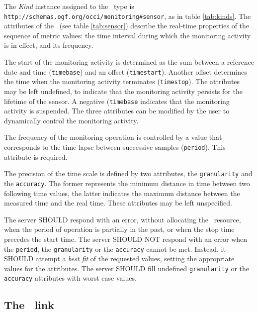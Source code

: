 \documentclass[10pt,a4paper]{article}
\begin{document}
The {\em Kind} instance assigned to the \sens\ type is {\tt http://schemas.ogf.org/occi/monitoring\#sensor}, as in table \ref{tab:kinds}. The attributes of the \sens\ (see table \ref{tab:sensor}) describe the real-time properties of the sequence of metric values: the time interval during which the monitoring activity is in effect, and its frequency.

The start of the monitoring activity is determined as the sum between a reference date and time ({\tt timebase}) and an offset ({\tt timestart}). Another offset determines the time when the monitoring activity terminates ({\tt timestop}). The attributes may be left undefined, to indicate that the monitoring activity persists for the lifetime of the sensor. A negative ({\tt timebase} indicates that the monitoring activity is suspended. The three attributes can be modified by the user to dynamically control the monitoring activity.

The frequency of the monitoring operation is controlled by a value that corresponds to the time lapse between successive samples ({\tt period}). This attribute is required.

The precision of the time scale is defined by two attributes, the {\tt granularity} and the {\tt accuracy}. The former represents the minimum distance in time between two following time values, the latter indicates the maximum distance between the measured time and the real time. These attributes may be left unspecified.

The server SHOULD respond with an error, without allocating the \sens\ resource, when the period of operation is partially in the past, or when the stop time precedes the start time. The server SHOULD NOT respond with an error when the {\tt period}, the {\tt granularity} or the {\tt accuracy} cannot be met. Instead, it SHOULD attempt a {\em best fit} of the requested values, setting the appropriate values for the attributes. The server SHOULD fill undefined {\tt granularity} or the {\tt accuracy} attributes with worst case values. 

\subsection{The \coll\ link \label{sec:collector}}

\end{document}
